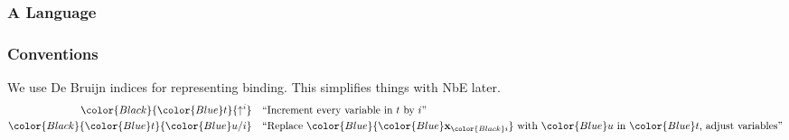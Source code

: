 \documentclass[svgnames]{beamer}
\newcommand\fmttm[1]{{\color{Blue}#1}}
\newcommand{\Uni}{\mathcal{U}}
\newcommand{\Unit}{\mathsf{Unit}}
\newcommand{\unit}{\mathsf{tt}}
\newcommand{\var}[1]{\fmttm{\mathbf{x}_{\color{Black} #1}}}
\newcommand{\emp}{()}
\newcommand{\isctx}[1]{\fmttm{#1}\vdash}
\newcommand{\isterm}[3]{\fmttm{#1}\vdash\fmttm{#2}:\fmttm{#3}}
\newcommand{\istype}[2]{\fmttm{#1}\vdash\fmttm{#2}}
\newcommand{\subst}[3]{{\color{Black} \fmttm{#1}\{\fmttm{#2}/#3\}}}
\newcommand{\weaken}[2]{{\color{Black} \fmttm{#1}\{\uparrow^{#2}\}}}
\newcommand{\app}[2]{{\color{Black} \fmttm{#1}(\fmttm{#2})}}
\begin{document}
\begin{frame}
  \frametitle{A Language}
\end{frame}

\begin{frame}
  \frametitle{Conventions}
  We use De Bruijn indices for representing binding. This simplifies things with NbE later.
  \begin{align*}
    \weaken{t}{i} &\quad \text{``Increment every variable in $t$ by $i$''}\\
    \subst{t}{u}{i} &\quad \text{``Replace $\fmttm{\var{i}}$ with $\fmttm{u}$ in $\fmttm{t}$, adjust variables''}
  \end{align*}
\end{frame}
\end{document}
